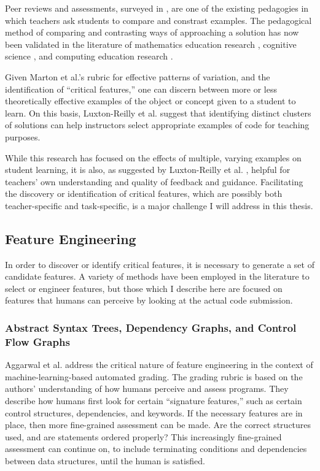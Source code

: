 \documentclass[12pt]{article}
\begin{document}
Peer reviews and assessments, surveyed in \cite{peerReview98}, are one of the existing pedagogies in which teachers ask students to compare and constrast examples. The pedagogical method of comparing and contrasting ways of approaching a solution has now been validated in the literature of mathematics education research \cite{Star07}, cognitive science \cite{loewenstein2003analogical,kurtz01learning,telling}, and computing education research \cite{Suhonen08, PatitsasICER13}.

Given Marton et al.'s rubric for effective patterns of variation, and the identification of ``critical features,'' one can discern between more or less theoretically effective examples of the object or concept given to a student to learn. On this basis, Luxton-Reilly et al. \cite{Luxton13} suggest that identifying distinct clusters of solutions can help instructors select appropriate examples of code for teaching purposes. 

While this research has focused on the effects of multiple, varying examples on student learning, it is also, as suggested by Luxton-Reilly et al. \cite{Luxton13}, helpful for teachers' own understanding and quality of feedback and guidance. Facilitating the discovery or identification of critical features, which are possibly both teacher-specific and task-specific, is a major challenge I will address in this thesis.

\subsection{Feature Engineering}

In order to discover or identify critical features, it is necessary to generate a set of candidate features. A variety of methods have been employed in the literature to select or engineer features, but those which I describe here are focused on features that humans can perceive by looking at the actual code submission.

\subsubsection{Abstract Syntax Trees, Dependency Graphs, and Control Flow Graphs}

Aggarwal et al. \cite{aggarwalprinciples} address the critical nature of feature engineering in the context of machine-learning-based automated grading. The grading rubric is based on the authors' understanding of how humans perceive and assess programs. They describe how humans first look for certain ``signature features,'' such as certain control structures, dependencies, and keywords. If the necessary features are in place, then more fine-grained assessment can be made. Are the correct structures used, and are statements ordered properly? This increasingly fine-grained assessment can continue on, to include terminating conditions and dependencies between data structures, until the human is satisfied. 
\end{document}
